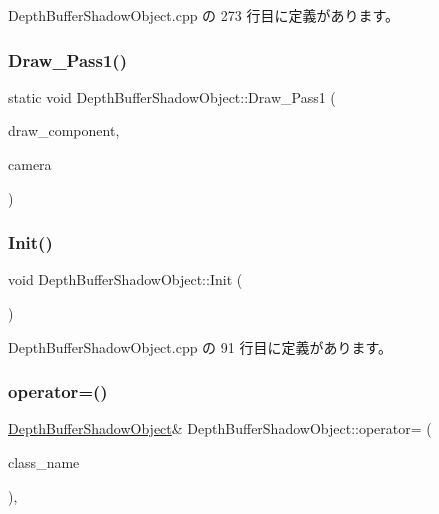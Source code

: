  Depth\+Buffer\+Shadow\+Object.\+cpp の 273 行目に定義があります。

\mbox{\label{class_depth_buffer_shadow_object_a4bf8a72a447aa6ff150f3fef630ab448}} 
\subsubsection{\texorpdfstring{Draw\+\_\+\+Pass1()}{Draw\_Pass1()}}
{\footnotesize\ttfamily static void Depth\+Buffer\+Shadow\+Object\+::\+Draw\+\_\+\+Pass1 (\begin{DoxyParamCaption}\item[{Draw\+Component $\ast$}]{draw\+\_\+component,  }\item[{\mbox{\hyperlink{class_camera}{Camera}} $\ast$}]{camera }\end{DoxyParamCaption})\hspace{0.3cm}{\ttfamily [static]}}

\mbox{\label{class_depth_buffer_shadow_object_a03e23f51e5e68babc7a1a42d0fedfba0}} 
\subsubsection{\texorpdfstring{Init()}{Init()}}
{\footnotesize\ttfamily void Depth\+Buffer\+Shadow\+Object\+::\+Init (\begin{DoxyParamCaption}{ }\end{DoxyParamCaption})\hspace{0.3cm}{\ttfamily [static]}}



 Depth\+Buffer\+Shadow\+Object.\+cpp の 91 行目に定義があります。

\mbox{\label{class_depth_buffer_shadow_object_a00d8b986d4f2c1d82dd836c0f5ce3751}} 
\subsubsection{\texorpdfstring{operator=()}{operator=()}}
{\footnotesize\ttfamily \mbox{\hyperlink{class_depth_buffer_shadow_object}{Depth\+Buffer\+Shadow\+Object}}\& Depth\+Buffer\+Shadow\+Object\+::operator= (\begin{DoxyParamCaption}\item[{const \mbox{\hyperlink{class_depth_buffer_shadow_object}{Depth\+Buffer\+Shadow\+Object}} \&}]{class\+\_\+name }\end{DoxyParamCaption})\hspace{0.3cm}{\ttfamily [private]}, {\ttfamily [delete]}}

